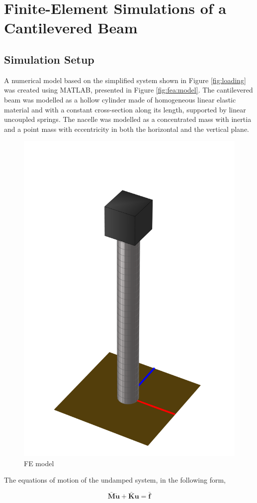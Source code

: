 \documentclass{article}
\begin{document}
\clearpage

\section{Finite-Element Simulations of a Cantilevered Beam}
\label{sec:simulations}

\subsection{Simulation Setup}

A numerical model based on the simplified system shown in Figure \autoref{fig:loading} was created using MATLAB, presented in Figure \autoref{fig:fea:model}. The cantilevered beam was modelled as a hollow cylinder made of  homogeneous linear elastic material and with a constant cross-section along its length, supported by linear uncoupled springs. The nacelle was modelled as a concentrated mass with inertia and a point mass with eccentricity in both the horizontal and the vertical plane.

\begin{figure}[ht]
    \centering
    \includegraphics[width=0.5\linewidth]{manuscript/figures/FEModel.png}
    \caption{FE model}
    \label{fig:fea:model}
\end{figure}

The equations of motion of the undamped system, in the following form,

\begin{equation}
    \mathbf{\bar{M}}\ddot{\mathbf{u}}+\mathbf{\bar{K}}\mathbf{u} = \mathbf{\bar{f}}
    \label{eq:fea:system}
\end{equation}
\end{document}
